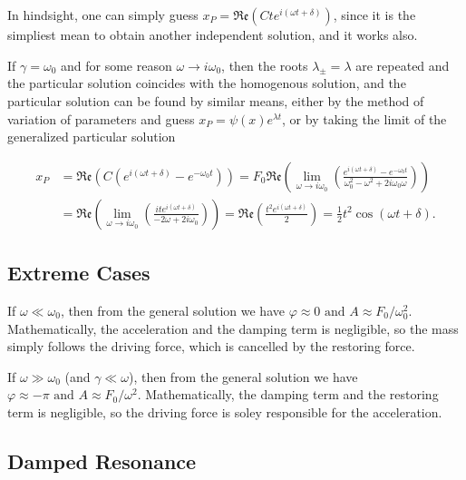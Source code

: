 \documentclass[english,a4paper,12pt]{report}
\begin{document}
In hindsight, one can simply guess \(x_{P} = \mathfrak{Re} (Cte^{i(\omega t+\delta )} )  \), since it is the simpliest mean to obtain another independent solution, and it works also. 

If \(\gamma = \omega _{0} \) and for some reason \(\omega \to i\omega _{0}\), then the roots \(\lambda _{\pm } = \lambda  \) are repeated and the particular solution coincides with the homogenous solution, and the particular solution can be found by similar means, either by the method of variation of parameters and guess \(x_{P} = \psi (x)e^{\lambda t}  \), or by taking the limit of the generalized particular solution

\begin{equation}
    \begin{aligned} 
    x_{P} &= \mathfrak{Re} (C(e^{i(\omega t+\delta )} - e^{-\omega _{0}t } )) = F_0 \mathfrak{Re} \left( \lim_{\omega  \to i\omega _{0} } \left( \frac{e^{i(\omega t+\delta )}-e^{-\omega _{0}t }  }{\omega _{0}^2-\omega ^2+2i\omega _{0}\omega  }  \right) \right) \\ &= \mathfrak{Re} \left( \lim_{\omega  \to i\omega _{0} } \left( \frac{ite^{i(\omega t+\delta )} }{-2\omega + 2i\omega _{0} }  \right) \right) = \mathfrak{Re} \left( \frac{t^2 e^{i(\omega t+\delta )} }{2}  \right) = \frac{1}{2}t^2\cos (\omega t+\delta ). 
    \end{aligned} 
\end{equation}

\subsection{Extreme Cases}

If \(\omega \ll \omega _{0} \), then from the general solution we have \(\varphi \approx 0 \text { and } A \approx F_0 /\omega _{0}^2  \). Mathematically, the acceleration and the damping term is negligible, so the mass simply follows the driving force, which is cancelled by the restoring force. 

If \(\omega \gg \omega _{0}\) (and \(\gamma \ll \omega \)), then from the general solution we have \( \varphi \approx -\pi \text { and } A \approx F_0 /\omega ^2  \). Mathematically, the damping term and the restoring term is negligible, so the driving force is soley responsible for the acceleration.

\subsection{Damped Resonance}
\end{document}
